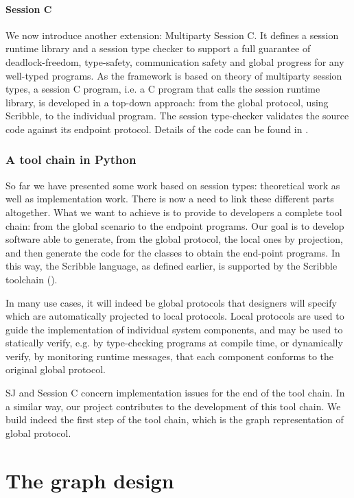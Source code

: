 \documentclass[a4paper,11pt,twoside]{report}
\begin{document}
\subsubsection{Session C}
We now introduce another extension: Multiparty Session C. It defines a session runtime library and a session type checker to support a full guarantee of deadlock-freedom, type-safety, communication safety and global progress for any well-typed programs. As the framework is based on theory of multiparty session types, a session C program, i.e. a C program that calls the session runtime library, is developed in a top-down approach: from the global protocol, using Scribble, to the individual program. The session type-checker validates the source code against its endpoint protocol. Details of the code can be found in \cite{ngmultiparty}.


\subsection{A tool chain in Python}
So far we have presented some work based on session types: theoretical work as well as implementation work. There is now a need to link these different parts altogether. What we want to achieve is to provide to developers a complete tool chain: from the global scenario to the endpoint programs. Our goal is to develop software able to generate, from the global protocol, the local ones by projection, and then generate the code for the classes to obtain the end-point programs. In this way, the Scribble language, as defined earlier, is supported by the Scribble toolchain (\cite{scribble}). 

In many use cases, it will indeed be global protocols that designers will specify which are automatically projected to local protocols. Local protocols are used to guide the implementation of individual system components, and may be used to statically verify, e.g. by type-checking programs at compile time, or dynamically verify, by monitoring runtime messages, that each component conforms to the original global protocol.

SJ and Session C concern implementation issues for the end of the tool chain. In a similar way, our project contributes to the development of this tool chain. We build indeed the first step of the tool chain, which is the graph representation of global protocol.




\chapter{The graph design}
\end{document}
